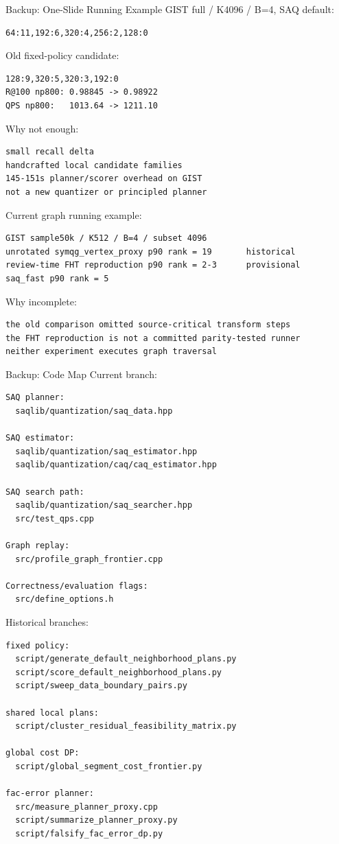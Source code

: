 \documentclass[aspectratio=169,10pt]{beamer}
\begin{document}
\begin{frame}[fragile]{Backup: One-Slide Running Example}
\small
GIST full / K4096 / B=4, SAQ default:
\begin{lstlisting}
64:11,192:6,320:4,256:2,128:0
\end{lstlisting}

Old fixed-policy candidate:
\begin{lstlisting}
128:9,320:5,320:3,192:0
R@100 np800: 0.98845 -> 0.98922
QPS np800:   1013.64 -> 1211.10
\end{lstlisting}

Why not enough:
\begin{lstlisting}
small recall delta
handcrafted local candidate families
145-151s planner/scorer overhead on GIST
not a new quantizer or principled planner
\end{lstlisting}

Current graph running example:
\begin{lstlisting}
GIST sample50k / K512 / B=4 / subset 4096
unrotated symqg_vertex_proxy p90 rank = 19       historical
review-time FHT reproduction p90 rank = 2-3      provisional
saq_fast p90 rank = 5
\end{lstlisting}

Why incomplete:
\begin{lstlisting}
the old comparison omitted source-critical transform steps
the FHT reproduction is not a committed parity-tested runner
neither experiment executes graph traversal
\end{lstlisting}
\end{frame}

\begin{frame}[fragile]{Backup: Code Map}
\scriptsize
Current branch:
\begin{lstlisting}
SAQ planner:
  saqlib/quantization/saq_data.hpp

SAQ estimator:
  saqlib/quantization/saq_estimator.hpp
  saqlib/quantization/caq/caq_estimator.hpp

SAQ search path:
  saqlib/quantization/saq_searcher.hpp
  src/test_qps.cpp

Graph replay:
  src/profile_graph_frontier.cpp

Correctness/evaluation flags:
  src/define_options.h
\end{lstlisting}

Historical branches:
\begin{lstlisting}
fixed policy:
  script/generate_default_neighborhood_plans.py
  script/score_default_neighborhood_plans.py
  script/sweep_data_boundary_pairs.py

shared local plans:
  script/cluster_residual_feasibility_matrix.py

global cost DP:
  script/global_segment_cost_frontier.py

fac-error planner:
  src/measure_planner_proxy.cpp
  script/summarize_planner_proxy.py
  script/falsify_fac_error_dp.py
\end{lstlisting}
\end{frame}
\end{document}
